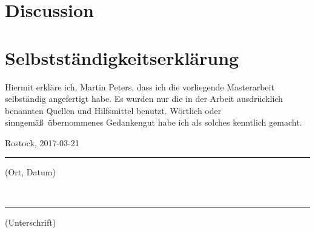 \documentclass[12pt, a4paper, titlepage, oneside, final]{book}
\newcommand{\thedate}{2017-03-21}					%
\begin{document}
	\chapter{Discussion}
	\label{sec:discussion}
	
	
	
	\newpage
	
	\chapter*{Selbstständigkeitserklärung}
	Hiermit erkläre ich, Martin Peters, dass ich die vorliegende Masterarbeit selbständig angefertigt habe. Es wurden nur die in der Arbeit ausdrücklich benannten Quellen und Hilfsmittel benutzt. Wörtlich oder sinngemä\ss \ übernommenes Gedankengut habe ich als solches kenntlich gemacht.
	
	\vspace{25mm}
	
	\hfil
	\begin{minipage}[t]{55mm}
		\centering
		Rostock, \thedate\\
		\vspace{-1.9em}
		\rule[-8pt]{\textwidth}{0.5pt}
		{\footnotesize (Ort, Datum)}
	\end{minipage}
	\hfil\hfil
	\begin{minipage}[t]{55mm}
		\centering
		\ \\
		\vspace{-1.9em}
		\rule[-8pt]{\textwidth}{0.5pt}
		{\footnotesize (Unterschrift)}
	\end{minipage}

	\newpage
	
	\printbibliography[heading=bibintoc]
	
	\newpage
	
	
	\printglossary[type=\acronymtype]
	\printglossary[type=main]
	
	\begin{appendices}
		\noappendicestocpagenum
		
		\label{sec:appendix}
		
	\end{appendices}
\end{document}
